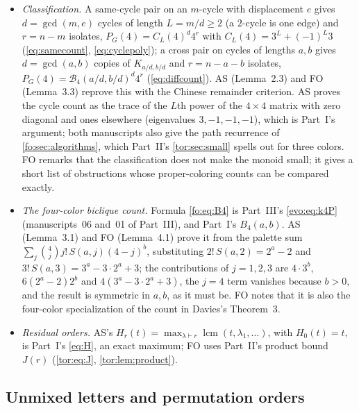 \documentclass[11pt,a4paper]{article}
\numberwithin{equation}{section}
\theoremstyle{definition}
\theoremstyle{remark}
\newcommand{\lcm}{\operatorname{lcm}}
\newcommand{\Bip}{\mathcal B}
\begin{document}
\begin{itemize}
 FO's proof, like AS's, uses the \emph{rightmost} occurrence; FO's audit
 notes that this direction of composition is essential and that the
 collapsed edge uses $p^{-j}$, which is legitimate because $G$ contains all
 translates.
\item \emph{Classification.} A same-cycle pair on an $m$-cycle with
 displacement $e$ gives $d=\gcd(m,e)$ cycles of length $L=m/d\ge2$ (a
 $2$-cycle is one edge) and $r=n-m$ isolates,
 $P_G(4)=C_L(4)^d4^r$ with $C_L(4)=3^L+(-1)^L3$ (\eqref{eq:samecount},
 \eqref{eq:cyclepoly}); a cross pair on cycles of lengths $a,b$ gives
 $d=\gcd(a,b)$ copies of $K_{a/d,b/d}$ and $r=n-a-b$ isolates,
 $P_G(4)=\Bip_4(a/d,b/d)^d4^r$ (\eqref{eq:diffcount}). AS (Lemma~2.3) and FO
 (Lemma~3.3) reprove this with the Chinese remainder criterion. AS proves
 the cycle count as the trace of the $L$th power of the $4\times4$ matrix
 with zero diagonal and ones elsewhere (eigenvalues $3,-1,-1,-1$), which is
 Part~I's argument; both manuscripts also give the path recurrence of
 \cref{fo:sec:algorithms}, which Part~II's \cref{tor:sec:small} spells out
 for three colors. FO remarks that the classification does not make the
 monoid small; it gives a short list of obstructions whose proper-coloring
 counts can be compared exactly.
\item \emph{The four-color biclique count.} Formula \eqref{fo:eq:B4} is
 Part~III's \eqref{evo:eq:k4P} (manuscripts~06 and~01 of Part~III), and
 Part~I's $B_4(a,b)$. AS (Lemma~3.1) and FO (Lemma~4.1) prove it from the
 palette sum $\sum_j\binom4jj!\,S(a,j)(4-j)^b$, substituting
 $2!\,S(a,2)=2^a-2$ and $3!\,S(a,3)=3^a-3\cdot2^a+3$; the contributions of
 $j=1,2,3$ are $4\cdot3^b$, $6(2^a-2)2^b$ and $4(3^a-3\cdot2^a+3)$, the
 $j=4$ term vanishes because $b>0$, and the result is symmetric in $a,b$,
 as it must be. FO notes that it is also the four-color specialization of
 the count in Davies's Theorem~3.
\item \emph{Residual orders.} AS's $H_r(t)=\max_{\lambda\vdash r}\lcm(t,\lambda_1,\ldots)$,
 with $H_0(t)=t$, is Part~I's \eqref{eq:H}, an exact maximum; FO uses Part~II's
 product bound $J(r)$ (\eqref{tor:eq:J}, \cref{tor:lem:product}).
\end{itemize}

\subsection{Unmixed letters and permutation orders}\label{fo:sec:unmixed}
\end{document}
